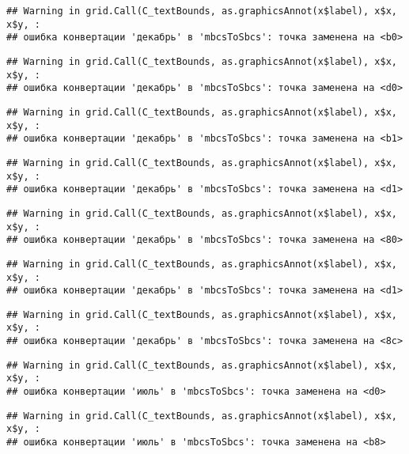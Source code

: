 \documentclass[
]{article}
\begin{document}
\begin{verbatim}
## Warning in grid.Call(C_textBounds, as.graphicsAnnot(x$label), x$x, x$y, :
## ошибка конвертации 'декабрь' в 'mbcsToSbcs': точка заменена на <b0>
\end{verbatim}

\begin{verbatim}
## Warning in grid.Call(C_textBounds, as.graphicsAnnot(x$label), x$x, x$y, :
## ошибка конвертации 'декабрь' в 'mbcsToSbcs': точка заменена на <d0>
\end{verbatim}

\begin{verbatim}
## Warning in grid.Call(C_textBounds, as.graphicsAnnot(x$label), x$x, x$y, :
## ошибка конвертации 'декабрь' в 'mbcsToSbcs': точка заменена на <b1>
\end{verbatim}

\begin{verbatim}
## Warning in grid.Call(C_textBounds, as.graphicsAnnot(x$label), x$x, x$y, :
## ошибка конвертации 'декабрь' в 'mbcsToSbcs': точка заменена на <d1>
\end{verbatim}

\begin{verbatim}
## Warning in grid.Call(C_textBounds, as.graphicsAnnot(x$label), x$x, x$y, :
## ошибка конвертации 'декабрь' в 'mbcsToSbcs': точка заменена на <80>
\end{verbatim}

\begin{verbatim}
## Warning in grid.Call(C_textBounds, as.graphicsAnnot(x$label), x$x, x$y, :
## ошибка конвертации 'декабрь' в 'mbcsToSbcs': точка заменена на <d1>
\end{verbatim}

\begin{verbatim}
## Warning in grid.Call(C_textBounds, as.graphicsAnnot(x$label), x$x, x$y, :
## ошибка конвертации 'декабрь' в 'mbcsToSbcs': точка заменена на <8c>
\end{verbatim}

\begin{verbatim}
## Warning in grid.Call(C_textBounds, as.graphicsAnnot(x$label), x$x, x$y, :
## ошибка конвертации 'июль' в 'mbcsToSbcs': точка заменена на <d0>
\end{verbatim}

\begin{verbatim}
## Warning in grid.Call(C_textBounds, as.graphicsAnnot(x$label), x$x, x$y, :
## ошибка конвертации 'июль' в 'mbcsToSbcs': точка заменена на <b8>
\end{verbatim}
\end{document}
